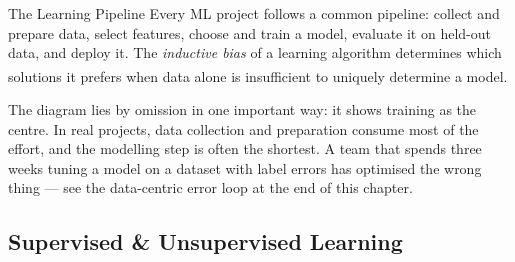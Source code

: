 \begin{v3topic}{The Learning Pipeline}
    Every ML project follows a common pipeline: collect and prepare data, select features, choose and train a model, evaluate it on held-out data, and deploy it.
    The \emph{inductive bias} of a learning algorithm determines which solutions it prefers when data alone is insufficient to uniquely determine a model\textsuperscript{\cite[][p.~15]{iiiCourseMachineLearning}}.
\visualseparator
    \begin{center}
\label{fig:ml-pipeline}
    \end{center}
\end{v3topic}

\begin{engineernote}
The diagram lies by omission in one important way: it shows training as the
centre. In real projects, data collection and preparation consume most of the
effort, and the modelling step is often the shortest. A team that spends three
weeks tuning a model on a dataset with label errors has optimised the wrong
thing --- see the data-centric error loop at the end of this chapter.
\end{engineernote}

\subsection{Supervised \& Unsupervised Learning}

